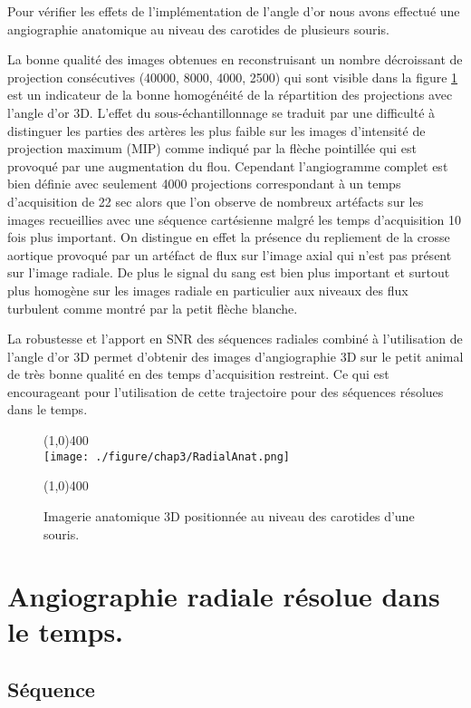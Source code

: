 Pour vérifier les effets de l'implémentation de l'angle d'or nous avons effectué une angiographie anatomique au niveau des carotides de plusieurs souris.

La bonne qualité des images obtenues en reconstruisant un nombre décroissant de projection consécutives (40000, 8000, 4000, 2500) qui sont visible dans la figure \ref{fig:RadialAnat} est un indicateur de la bonne homogénéité de la répartition des projections avec l'angle d'or 3D.
L'effet du sous-échantillonnage se traduit par une difficulté à distinguer les parties des artères les plus faible sur les images d'intensité de projection maximum (MIP) comme indiqué par la flèche pointillée qui est provoqué par une augmentation du flou. Cependant l'angiogramme complet est bien définie avec seulement 4000 projections correspondant à un temps d'acquisition de 22 sec alors que l'on observe de nombreux artéfacts sur les images recueillies avec une séquence cartésienne malgré les temps d'acquisition 10 fois plus important. On distingue en effet la présence du repliement de la crosse aortique provoqué par un artéfact de flux sur l'image axial qui n'est pas présent sur l'image radiale. De plus le signal du sang est bien plus important et surtout plus homogène sur les images radiale en particulier aux niveaux des flux turbulent comme montré par la petit flèche blanche.

La robustesse et l'apport en SNR des séquences radiales combiné à l'utilisation de l'angle d'or 3D permet d'obtenir des images d'angiographie 3D sur le petit animal de très bonne qualité en des temps d'acquisition restreint. Ce qui est encourageant pour l'utilisation de cette trajectoire pour des séquences résolues dans le temps.

\begin{figure}[h]
\centering \line(1,0){400} \\
\texttt{[image: ./figure/chap3/RadialAnat.png]}
\caption[Comparaison entre les trajectoires]{\label{fig:RadialAnat} Imagerie anatomique 3D positionnée au niveau des carotides d'une souris.}
\line(1,0){400} \\ \end{figure}

\section{Angiographie radiale résolue dans le temps.}

\subsection{Séquence}

